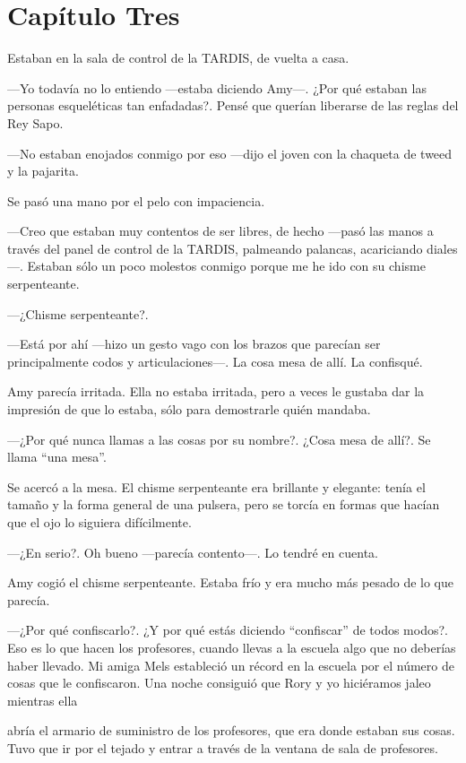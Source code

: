 \chapter*{Capítulo Tres} 

Estaban en la sala de control de la TARDIS, de vuelta a casa.

---Yo todavía no lo entiendo ---estaba diciendo Amy---. ¿Por qué estaban las personas esqueléticas tan enfadadas?. Pensé que querían liberarse de las reglas del Rey Sapo.

---No estaban enojados conmigo por eso ---dijo el joven con la chaqueta de tweed y la pajarita.

Se pasó una mano por el pelo con impaciencia.

---Creo que estaban muy contentos de ser libres, de hecho ---pasó las manos a través del panel de control de la TARDIS, palmeando palancas, acariciando diales---. Estaban sólo un poco molestos conmigo porque me he ido con su chisme serpenteante.

---¿Chisme serpenteante?.

---Está por ahí ---hizo un gesto vago con los brazos que parecían ser principalmente codos y articulaciones---. La cosa mesa de allí. La confisqué.

Amy parecía irritada. Ella no estaba irritada, pero a veces le gustaba dar la impresión de que lo estaba, sólo para demostrarle quién mandaba.

---¿Por qué nunca llamas a las cosas por su nombre?. ¿Cosa mesa de allí?. Se llama ``una mesa''.

Se acercó a la mesa. El chisme serpenteante era brillante y elegante: tenía el tamaño y la forma general de una pulsera, pero se torcía en formas que hacían que el ojo lo siguiera difícilmente.

---¿En serio?. Oh bueno ---parecía contento---. Lo tendré en cuenta.

Amy cogió el chisme serpenteante. Estaba frío y era mucho más pesado de lo que parecía.

---¿Por qué confiscarlo?. ¿Y por qué estás diciendo ``confiscar'' de todos modos?. Eso es lo que hacen los profesores, cuando llevas a la escuela algo que no deberías haber llevado. Mi amiga Mels estableció un récord en la escuela por el número de cosas que le confiscaron. Una noche consiguió que Rory y yo hiciéramos jaleo mientras ella

abría el armario de suministro de los profesores, que era donde estaban sus cosas. Tuvo que ir por el tejado y entrar a través de la ventana de sala de profesores.

